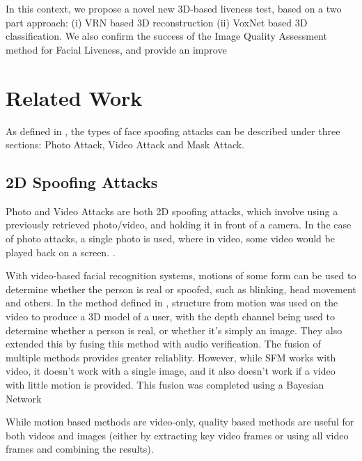 \documentclass[10pt,a4paper]{article}
\begin{document}

    In this context, we propose a novel new 3D-based liveness test, based on a two part approach: (i) VRN based 3D reconstruction (ii) VoxNet based 3D classification.
    We also confirm the success of the Image Quality Assessment method for Facial Liveness, and provide an improve

\section{Related Work}
    As defined in \cite{FaceSpoofingAttacksStudy}, the types of face spoofing attacks can be described under three sections: Photo Attack, Video Attack and Mask Attack.

    \subsection{2D Spoofing Attacks}
        Photo and Video Attacks are both 2D spoofing attacks, which involve using a previously retrieved photo/video, and holding it in front of a camera. In the case of photo attacks,
        a single photo is used, where in video, some video would be played back on a screen. \cite{FaceSpoofingAttacksStudy}.

        With video-based facial recognition systems, motions of some form can be used to determine whether the person is real or spoofed, such as blinking, head movement and others.
        In the method defined in \cite{SFMClassifier}, structure from motion was used on the video to produce a 3D model of a user, with the depth channel being used to determine whether a person is real, or whether it's simply an image.
        They also extended this by fusing this method with audio verification. The fusion of multiple methods provides greater reliablity. However, while SFM works with video, it doesn't work with a single image,
        and it also doesn't work if a video with little motion is provided. This fusion was completed using a Bayesian Network 

        While motion based methods are video-only, quality based methods are useful for both videos and images (either by extracting key video frames or using all video frames and combining the results).
\end{document}
